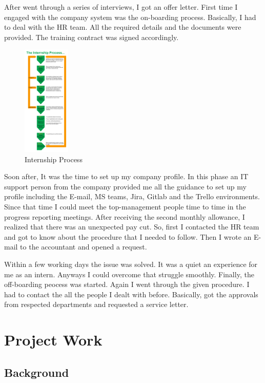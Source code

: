 \documentclass[twoside,12pt,times,onecolumn,a4paper]{report}
\begin{document}
\hspace{3em} After went through a series of interviews, I got an offer letter. First time I engaged with the company system was the on-boarding process. Basically, I had to deal with the HR team. All the required details and the documents were provided. The training contract was signed accordingly.

\begin{figure}
    \centering
    \includegraphics[width=0.2\textwidth]{intern}
    \caption{Internship Process}
\end{figure}

 Soon after, It was the time to set up my company profile. In this phase an IT support person from the company provided me all the guidance to set up my profile including the E-mail, MS teams, Jira, Gitlab and the Trello environments. Since that time I could meet the top-management people time to time in the progress reporting meetings. After receiving the second monthly allowance, I realized that there was an unexpected pay cut. So, first I contacted the HR team and got to know about the procedure that I needed to follow. Then I wrote an E-mail to the accountant and opened a request. 



Within a few working days the issue was solved. It was a quiet an experience for me as an intern. Anyways I could overcome that struggle smoothly. Finally, the off-boarding peocess was started. Again I went through the given procedure. I had to contact the all the people I dealt with before. Basically, got the approvals from respected departments and requested a service letter. 


\chapter{Project Work}

\section{Background}
\end{document}
